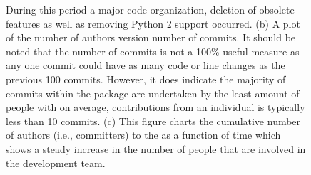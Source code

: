 \begin{figure}
{	During this period a major code organization, deletion of obsolete features as well as removing Python 2 support occurred.
	(b) A plot of the number of authors version number of commits.
	It should be noted that the number of commits is not a 100\% useful measure as any one commit could have as many code or line changes as the previous 100 commits.
	However, it does indicate the majority of commits within the package are undertaken by the least amount of people with on average, contributions from an individual is typically less than 10 commits.
	(c) This figure charts the cumulative number of authors (i.e., committers) to the \sunpypkg as a function of time which shows a steady increase in the number of people that are involved in the development team.
}
\label{fig:metafig}
\end{figure}
